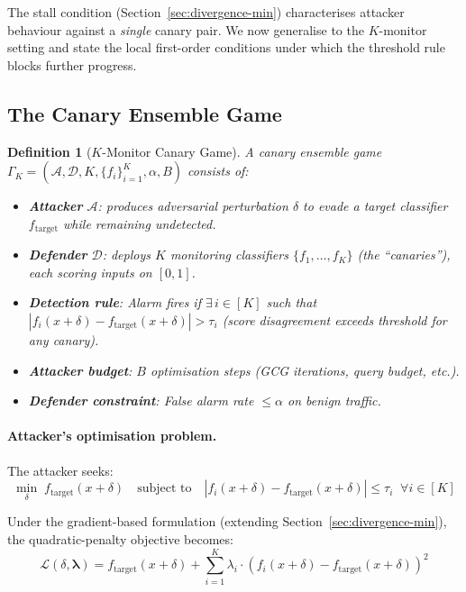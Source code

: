 \documentclass{article}
\newtheorem{definition}{Definition}
\begin{document}
The stall condition (Section~\ref{sec:divergence-min}) characterises attacker behaviour against a \emph{single} canary pair. We now generalise to the $K$-monitor setting and state the local first-order conditions under which the threshold rule blocks further progress.

\subsection{The Canary Ensemble Game}
\label{sec:ensemble-game}

\begin{definition}[$K$-Monitor Canary Game]
A canary ensemble game $\Gamma_K = (\mathcal{A}, \mathcal{D}, K, \{f_i\}_{i=1}^K, \alpha, B)$ consists of:
\begin{itemize}
    \item \textbf{Attacker} $\mathcal{A}$: produces adversarial perturbation $\delta$ to evade a target classifier $f_\text{target}$ while remaining undetected.
    \item \textbf{Defender} $\mathcal{D}$: deploys $K$ monitoring classifiers $\{f_1, \ldots, f_K\}$ (the ``canaries''), each scoring inputs on $[0,1]$.
    \item \textbf{Detection rule}: Alarm fires if $\exists\, i \in [K]$ such that $|f_i(x + \delta) - f_\text{target}(x + \delta)| > \tau_i$ (score disagreement exceeds threshold for any canary).
    \item \textbf{Attacker budget}: $B$ optimisation steps (GCG iterations, query budget, etc.).
    \item \textbf{Defender constraint}: False alarm rate $\leq \alpha$ on benign traffic.
\end{itemize}
\end{definition}

\paragraph{Attacker's optimisation problem.} The attacker seeks:
\begin{equation}
\min_{\delta} \; f_\text{target}(x + \delta) \quad \text{subject to} \quad |f_i(x + \delta) - f_\text{target}(x + \delta)| \leq \tau_i \;\; \forall i \in [K]
\label{eq:attacker-opt}
\end{equation}

Under the gradient-based formulation (extending Section~\ref{sec:divergence-min}), the quadratic-penalty objective becomes:
\begin{equation}
\mathcal{L}(\delta, \boldsymbol{\lambda}) = f_\text{target}(x + \delta) + \sum_{i=1}^K \lambda_i \cdot (f_i(x + \delta) - f_\text{target}(x + \delta))^2
\end{equation}
\end{document}
